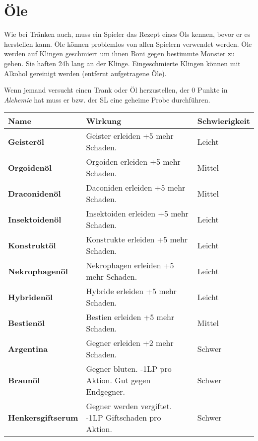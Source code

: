 \section{Öle}
Wie bei Tränken auch, muss ein Spieler das Rezept eines Öls kennen, bevor er es herstellen kann. Öle können problemlos von allen Spielern verwendet werden. Öle werden auf Klingen geschmiert um ihnen Boni gegen bestimmte Monster zu geben. Sie haften 24h lang an der Klinge. Eingeschmierte Klingen können mit Alkohol gereinigt werden (entfernt aufgetragene Öle).

Wenn jemand versucht einen Trank oder Öl herzustellen, der 0 Punkte in \textit{Alchemie} hat muss er bzw. der SL eine geheime Probe durchführen.

\begin{tabular}{|p{4cm}|p{8.5cm}|p{3cm}|}
\hline
\textbf{Name} & \textbf{Wirkung} & \textbf{Schwierigkeit} \\

\hline
\textbf{Geisteröl} & Geister erleiden +5 mehr Schaden. & Leicht \\

\hline
\textbf{Orgoidenöl} & Orgoiden erleiden +5 mehr Schaden. & Mittel \\

\hline
\textbf{Draconidenöl} & Daconiden erleiden +5 mehr Schaden. & Mittel \\

\hline
\textbf{Insektoidenöl} & Insektoiden erleiden +5 mehr Schaden. & Leicht \\

\hline
\textbf{Konstruktöl} & Konstrukte erleiden +5 mehr Schaden. & Leicht \\

\hline
\textbf{Nekrophagenöl} & Nekrophagen erleiden +5 mehr Schaden. & Leicht \\

\hline
\textbf{Hybridenöl} & Hybride erleiden +5 mehr Schaden. & Leicht \\

\hline
\textbf{Bestienöl} & Bestien erleiden +5 mehr Schaden. & Mittel \\

\hline
\textbf{Argentina} & Gegner erleiden +2 mehr Schaden. & Schwer \\

\hline
\textbf{Braunöl} & Gegner bluten. -1LP pro Aktion. Gut gegen Endgegner. & Schwer \\

\hline
\textbf{Henkersgiftserum} & Gegner werden vergiftet. -1LP Giftschaden pro Aktion. & Schwer \\

\hline
\end{tabular}
